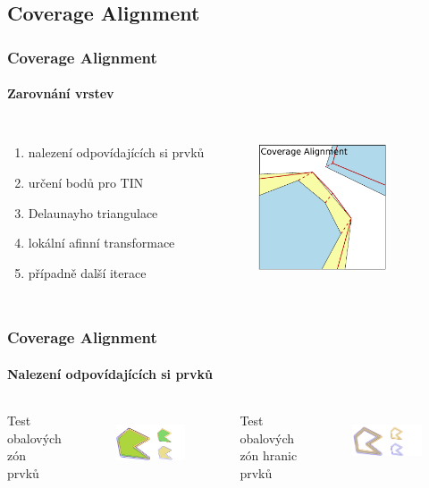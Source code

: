 \documentclass[unicode,bookmarksnumbered]{beamer}
\begin{document}
  \subsection{Coverage Alignment} %
  \begin{frame}
  \frametitle{Coverage Alignment}
    \framesubtitle{Zarovnání vrstev}
    \begin{columns}[c]
	\column{2in}
	\begin{enumerate}
	   \item nalezení odpovídajících si prvků
	   \item určení bodů pro TIN
	   \item Delaunayho triangulace 
	   \item lokální afinní transformace
	   \item případně další iterace
	\end{enumerate}
	\column{2in}
	  \begin{figure}
	  \centering
             \includegraphics[width=1.5in]{./pictures/align.pdf}
	  \label{fig:ca-princip}
	  \end{figure}
      \end{columns}
  \end{frame}

  \begin{frame}
  \frametitle{Coverage Alignment}
    \framesubtitle{Nalezení odpovídajících si prvků}
    \footnotesize 
    \begin{columns}[c]
	\column{2in}
	Test obalových zón prvků
	\begin{figure}
	  \centering
	    \includegraphics[width=2.5in]{./pictures/buffer-test.pdf}
	  \label{fig:ca1}
	  \end{figure}
	\column{2in}
	Test obalových zón hranic prvků
	  \begin{figure}
	  \centering
	    \includegraphics[width=2.5in]{./pictures/buffer-boundary.pdf}
	  \label{fig:ca2}
	  \end{figure}
    \end{columns}
  \end{frame}
\end{document}

